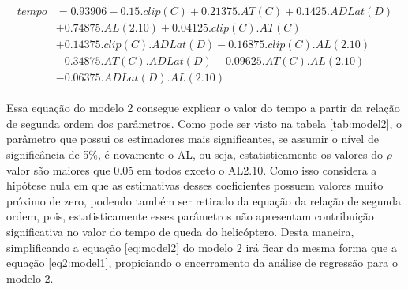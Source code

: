 \begin{align}
    \begin{split}
    tempo & = 0.93906 - 0.15.clip(C) + 0.21375.AT(C) + 0.1425.ADLat(D) \\
    & + 0.74875.AL(2.10) + 0.04125.clip(C).AT(C) \\
    & + 0.14375.clip(C).ADLat(D) - 0.16875.clip(C).AL(2.10) \\
    & - 0.34875.AT(C).ADLat(D) - 0.09625.AT(C).AL(2.10) \\ 
    & - 0.06375.ADLat(D).AL(2.10)
    \end{split}
    \label{eq:model2}
\end{align}

Essa equação do modelo 2 consegue explicar o valor do tempo a partir da relação de segunda ordem dos parâmetros. Como pode ser visto na tabela \ref{tab:model2}, o parâmetro que possui os estimadores mais significantes, se assumir o nível de significância de 5\%, é novamente o AL, ou seja, estatisticamente os valores do $\rho$ valor são maiores que 0.05 em todos exceto o AL2.10. Como isso considera a hipótese nula em que as estimativas desses coeficientes possuem valores muito próximo de zero, podendo também ser retirado da equação da relação de segunda ordem, pois, estatisticamente esses parâmetros não apresentam contribuição significativa no valor do tempo de queda do helicóptero. Desta maneira, simplificando a equação \ref{eq:model2} do modelo 2 irá ficar da mesma forma que a equação \ref{eq2:model1}, propiciando o encerramento da análise de regressão para o modelo 2.
